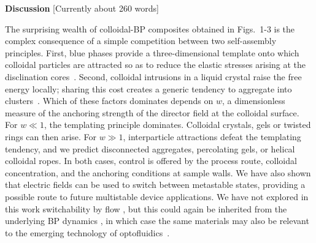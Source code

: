\documentclass[12pt]{article}
\begin{document}
\fi

\medskip
\noindent
\textbf{\large Discussion} [Currently about 260 words]

\noindent
The surprising wealth of colloidal-BP composites obtained in Figs.~1-3 is the complex consequence of a simple competition between two self-assembly principles. 
First, blue phases provide a three-dimensional template onto which colloidal particles are attracted so as to reduce the elastic stresses arising at the disclination cores~\cite{miha}. Second, colloidal intrusions in a liquid crystal raise the free energy locally; sharing this cost creates a generic tendency to aggregate into clusters~\cite{tiffany}. Which of these factors dominates depends on $w$, a dimensionless measure of the anchoring strength of the director field at the colloidal surface. For $w\ll 1$, the templating principle dominates. Colloidal crystals, gels or twisted rings can then arise. For $w \gg 1$, interparticle attractions defeat the templating tendency, and we predict disconnected aggregates, percolating gels, or helical colloidal ropes. In both cases, control is offered by the process route, colloidal concentration, and the anchoring conditions at sample walls. We have also shown that electric fields can be used to switch between metastable states, providing a possible route to future multistable device applications.
We have not explored in this work switchability by flow \cite{flowswitch}, but this could again be inherited from the underlying BP dynamics \cite{adriano,permeation2}, in which case the same materials may also be relevant to the emerging technology of optofluidics~\cite{optofluidics}.
\end{document}
